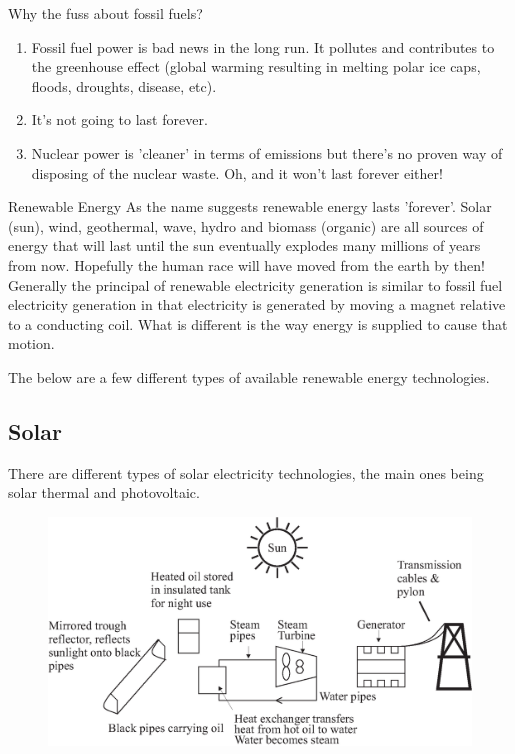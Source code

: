 Why the fuss about fossil fuels?
\begin{enumerate}
\item Fossil fuel power is bad news in
the long run. It pollutes and contributes to the greenhouse effect
(global warming resulting in melting polar ice caps, floods,
droughts, disease, etc).
\item It's not going to last forever.
\item Nuclear power is 'cleaner' in terms of emissions but there's no proven way
of disposing of the nuclear waste. Oh, and it won't last forever
either!
\end{enumerate}

Renewable Energy As the name suggests renewable energy lasts
'forever'. Solar (sun), wind, geothermal, wave, hydro and biomass
(organic) are all sources of energy that will last until the sun
eventually explodes many millions of years from now. Hopefully the
human race will have moved from the earth by then! Generally the
principal of renewable electricity generation is similar to fossil
fuel electricity generation in that electricity is generated by
moving a magnet relative to a conducting coil. What is different is
the way energy is supplied to cause that motion.

The below are a few different types of available renewable energy
technologies.

\subsection*{Solar}

There are different types of solar electricity technologies, the
main ones being solar thermal and photovoltaic.

\begin{figure}[H]
\centering
\includegraphics[scale=0.4]{../../epsimages/4solar1.eps}
\end{figure}

